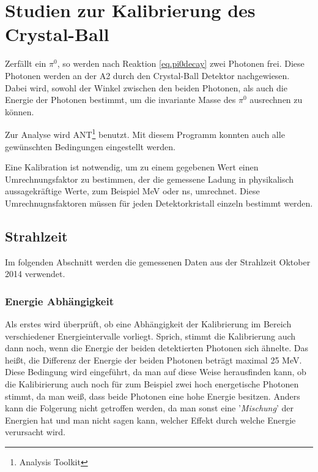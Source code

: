 \documentclass[a4paper,11pt,oneside,final,german,openbib,pdftex]{scrbook}
\begin{document}
{%








\chapter{Studien zur Kalibrierung des Crystal-Ball}

Zerf\"allt ein $\pi^0$, so werden nach Reaktion \ref{eq.pi0decay} zwei Photonen frei. Diese Photonen werden an der A2 durch den Crystal-Ball Detektor nachgewiesen. Dabei wird, sowohl der Winkel zwischen den beiden Photonen, als auch die Energie der Photonen bestimmt, um die invariante Masse des $\pi^0$ ausrechnen zu k\"onnen.

Zur Analyse wird ANT\footnote{Analysis Toolkit} benutzt. Mit diesem Programm konnten auch alle gew\"unschten Bedingungen eingestellt werden. 
\newline

Eine Kalibration ist notwendig, um zu einem gegebenen Wert einen Umrechnungsfaktor zu bestimmen, der die gemessene Ladung in physikalisch aussagekr\"aftige Werte, zum Beispiel MeV oder ns, umrechnet. Diese Umrechnugnsfaktoren m\"ussen f\"ur jeden Detektorkristall einzeln bestimmt werden.\cite{Un08}



\section{Strahlzeit}
\label{sec:Reelle-Daten}

Im folgenden Abschnitt werden die gemessenen Daten aus der Strahlzeit Oktober 2014 verwendet.

\subsection{Energie Abhängigkeit}
\label{sec:Energie-Interval-Abhaengigkeit}

Als erstes wird überprüft, ob eine Abhängigkeit der Kalibrierung im Bereich verschiedener Energieintervalle vorliegt. Sprich, stimmt die Kalibrierung auch dann noch, wenn die Energie der beiden detektierten Photonen sich ähnelte. Das hei{\ss}t, die Differenz der Energie der beiden Photonen betr\"agt maximal 25 MeV. Diese Bedingung wird eingef\"uhrt, da man auf diese Weise herausfinden kann, ob die Kalibirierung auch noch f\"ur zum Beispiel zwei hoch energetische Photonen stimmt, da man wei{\ss}, dass beide Photonen eine hohe Energie besitzen. Anders kann die Folgerung nicht getroffen werden, da man sonst eine '\textit{Mischung}' der Energien hat und man nicht sagen kann, welcher Effekt durch welche Energie verursacht wird.

}
\end{document}
